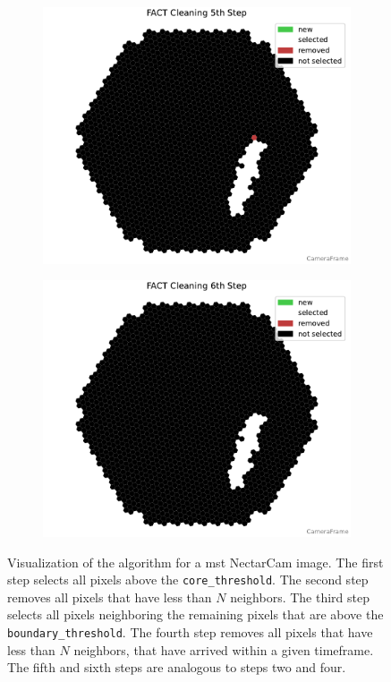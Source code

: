 \begin{figure}
\begin{subfigure}[b]{0.32\textwidth}
        \includegraphics[width=\textwidth]{plots/cleaner_steps/fact_5.pdf}
    \end{subfigure}
    \hfill
    \begin{subfigure}[b]{0.32\textwidth}
        \includegraphics[width=\textwidth]{plots/cleaner_steps/fact_6.pdf}
    \end{subfigure}
    \caption{Visualization of the \fact{} algorithm for a \gls{mst} NectarCam image. The first
    step selects all pixels above the \texttt{core\_threshold}. The second step removes all pixels that have less than
    \(N\) neighbors. The third step selects all pixels neighboring the remaining pixels that are above the
    \texttt{boundary\_threshold}. The fourth step removes all pixels that have less than \(N\) neighbors,
    that have arrived within a given timeframe. The fifth and sixth steps are analogous to steps two and four.}
    \label{fig:fact_cleaning}
\end{figure}

